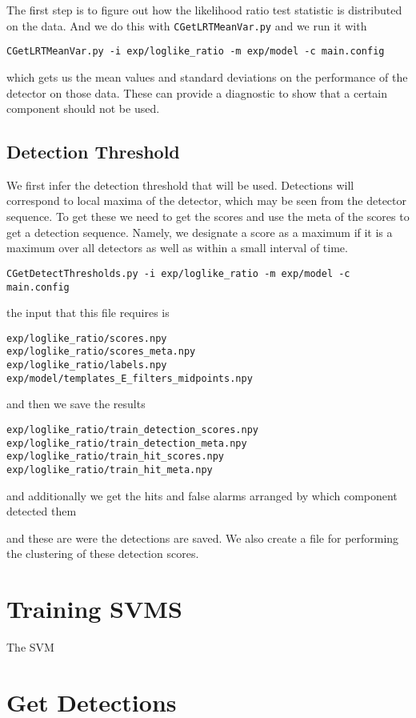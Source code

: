 \documentclass{article}
\begin{document}
The first step is to figure out how the likelihood ratio test
statistic is distributed on the data. And we do this with
\texttt{CGetLRTMeanVar.py}
and we run it with
\begin{verbatim}
CGetLRTMeanVar.py -i exp/loglike_ratio -m exp/model -c main.config
\end{verbatim}
which gets us the mean values and standard deviations on the performance of the
detector on those data.  These can provide a diagnostic to show
that a certain component should not be used. 

\subsection{Detection Threshold}

We first infer the detection threshold that will be used. Detections will correspond to local maxima
of the detector, which may be seen from the detector sequence.  To get these we need
to get the scores and use the meta of the scores to get a detection sequence.  Namely,
we designate a score as a maximum if it is a maximum over all detectors as well as within a small
interval of time.
\begin{verbatim}
CGetDetectThresholds.py -i exp/loglike_ratio -m exp/model -c main.config
\end{verbatim}
the input that this file requires is
\begin{verbatim}
exp/loglike_ratio/scores.npy
exp/loglike_ratio/scores_meta.npy
exp/loglike_ratio/labels.npy
exp/model/templates_E_filters_midpoints.npy
\end{verbatim}
and then we save the results
\begin{verbatim}
exp/loglike_ratio/train_detection_scores.npy
exp/loglike_ratio/train_detection_meta.npy
exp/loglike_ratio/train_hit_scores.npy
exp/loglike_ratio/train_hit_meta.npy
\end{verbatim}
and additionally we get the hits and false alarms
arranged by which component detected them

and these are were the detections are saved.  We also create a file for performing the clustering
of these detection scores.

\section{Training SVMS}

The SVM


\section{Get Detections}
\end{document}
